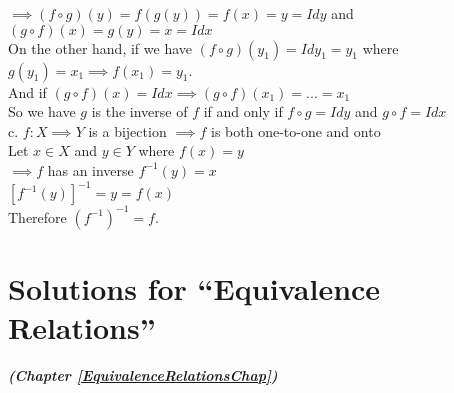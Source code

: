 $\implies (f\circ g)(y)=f(g(y))=f(x)=y=Idy$ and $(g\circ f)(x)=g(y)=x=Idx$\\
On the other hand, if we have $(f\circ g)(y_1)=Idy_1=y_1$ where $g(y_1)=x_1 \implies f(x_1)=y_1$.\\
And if $(g\circ f)(x)=Idx \implies (g\circ f)(x_1)=...=x_1$\\
So we have $g$ is the inverse of $f$ if and only if $f\circ g=Idy$ and $g\circ f=Idx$\\
c. $f: X\implies Y$ is a bijection $\implies f$ is both one-to-one and onto\\
Let $x\in X$ and $y\in Y$ where $f(x)=y$\\
$\implies f$ has an inverse $f^{-1}(y)=x$\\
$[f^{-1}(y)]^{-1}=y=f(x)$\\
Therefore $(f^{-1})^{-1}=f$.\\

\section{Solutions for  ``Equivalence Relations''}
\noindent\textbf{\textit{ (Chapter \ref{EquivalenceRelationsChap})}}\bigskip


